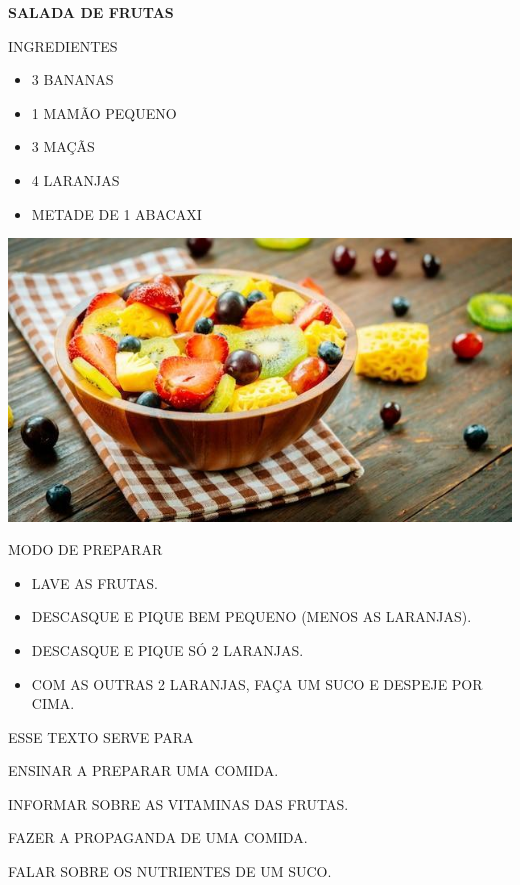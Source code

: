 \begin{myquote}
\textbf{SALADA DE FRUTAS}

INGREDIENTES

\begin{itemize}
\item 3 BANANAS
\item 1 MAMÃO PEQUENO
\item 3 MAÇÃS
\item 4 LARANJAS
\item METADE DE 1 ABACAXI
\end{itemize}

\begin{center}
\includegraphics[width=\textwidth]{media/image159.jpg}
\end{center}

MODO DE PREPARAR

\begin{itemize}
\item
  LAVE AS FRUTAS.
\item
  DESCASQUE E PIQUE BEM PEQUENO (MENOS AS LARANJAS).
\item
  DESCASQUE E PIQUE SÓ 2 LARANJAS.
\item
  COM AS OUTRAS 2 LARANJAS, FAÇA UM SUCO E DESPEJE POR CIMA.
\end{itemize}
\end{myquote}

ESSE TEXTO SERVE PARA

\begin{escolha}
\item ENSINAR A PREPARAR UMA COMIDA.

\item INFORMAR SOBRE AS VITAMINAS DAS FRUTAS.

\item FAZER A PROPAGANDA DE UMA COMIDA.

\item FALAR SOBRE OS NUTRIENTES DE UM SUCO.
\end{escolha}

